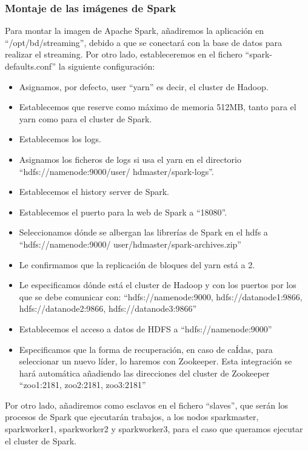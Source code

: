 \subsubsection {Montaje de las imágenes de Spark\label{montSpark}}

Para montar la imagen de Apache Spark, añadiremos la aplicación en “/opt/bd/streaming”, debido a que se conectará con la base de datos para realizar el streaming. Por otro lado, estableceremos en el fichero “spark-defaults.conf” la siguiente configuración:\par
\begin{itemize}
	\item Asignamos, por defecto, user “yarn” es decir, el cluster de Hadoop.
	\item Establecemos que reserve como máximo de memoria 512MB, tanto para el yarn como para el cluster de Spark.
	\item Establecemos los logs.
	\item Asignamos los ficheros de logs si usa el yarn en el directorio “hdfs://namenode:9000/user/ hdmaster/spark-logs”.
	\item Establecemos el history server de Spark.
	\item Establecemos el puerto para la web de Spark a “18080”.
	\item Seleccionamos dónde se albergan las librerías de Spark en el hdfs a “hdfs://namenode:9000/ user/hdmaster/spark-archives.zip”
	\item Le confirmamos que la replicación de bloques del yarn está a 2.
	\item Le especificamos dónde está el cluster de Hadoop y con los puertos por los que se debe comunicar con: “hdfs://namenode:9000, hdfs://datanode1:9866, hdfs://datanode2:9866, hdfs://datanode3:9866”
	\item Establecemos el acceso a datos de HDFS a “hdfs://namenode:9000”
	\item Especificamos que la forma de recuperación, en caso de caÍdas, para seleccionar un nuevo líder, lo haremos con Zookeeper. Esta integración se hará automática añadiendo las direcciones del cluster de Zookeeper “zoo1:2181, zoo2:2181, zoo3:2181”
\end{itemize}

Por otro lado, añadiremos como esclavos en el fichero “slaves”, que serán los procesos de Spark que ejecutarán trabajos, a los nodos sparkmaster, sparkworker1, sparkworker2 y sparkworker3, para el caso que queramos ejecutar el cluster de Spark.\par

